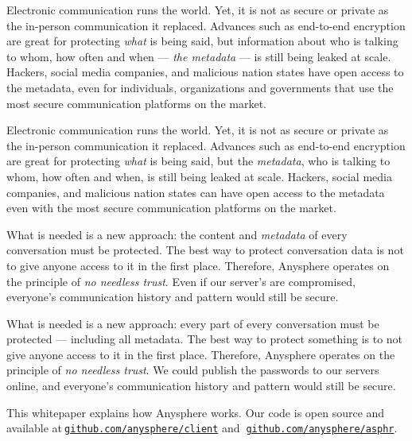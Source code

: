 



Electronic communication runs the world. Yet, it is not as secure or private as the in-person communication it replaced. Advances such as end-to-end encryption are great for protecting \textit{what} is being said, but information about who is talking to whom, how often and when — \textit{the metadata} — is still being leaked at scale. Hackers, social media companies, and malicious nation states have open access to the metadata, even for individuals, organizations and governments that use the most secure communication platforms on the market.

Electronic communication runs the world. Yet, it is not as secure or private as the in-person communication it replaced. Advances such as end-to-end encryption are great for protecting \textit{what} is being said, but the \textit{metadata}, who is talking to whom, how often and when, is still being leaked at scale. Hackers, social media companies, and malicious nation states can have open access to the metadata even with the most secure communication platforms on the market.

What is needed is a new approach: the content and \textit{metadata} of every conversation must be protected. The best way to protect conversation data is not to give anyone access to it in the first place. Therefore, Anysphere operates on the principle of \textit{no needless trust}. Even if our server's are compromised, everyone's communication history and pattern would still be secure.

What is needed is a new approach: every part of every conversation must be protected — including all metadata. The best way to protect something is to not give anyone access to it in the first place. Therefore, Anysphere operates on the principle of \textit{no needless trust}. We could publish the passwords to our servers online, and everyone's communication history and pattern would still be secure.

This whitepaper explains how Anysphere works. Our code is open source and available at$~${\tt \href{https://github.com/anysphere/client}{github.com/anysphere/client}} and $~${\tt \href{https://github.com/anysphere/client}{github.com/anysphere/asphr}}.